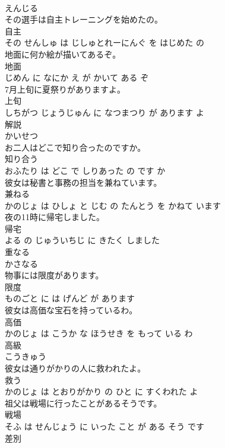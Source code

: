 \documentclass[8pt]{extreport}
\begin{document}
\begin{CJK}{UTF8}{min}
\\	えんじる		
\\	その選手は自主トレーニングを始めたの。	
\\	自主 
\\	その せんしゅ は じしゅとれーにんぐ を はじめた の			
\\	地面に何か絵が描いてあるぞ。	
\\	地面 
\\	じめん に なにか え が かいて ある ぞ			
\\	7月上旬に夏祭りがありますよ。	
\\	上旬 
\\	しちがつ じょうじゅん に なつまつり が あります よ			
\\	解説	
\\	かいせつ		
\\	お二人はどこで知り合ったのですか。	
\\	知り合う 
\\	おふたり は どこ で しりあった の です か			
\\	彼女は秘書と事務の担当を兼ねています。	
\\	兼ねる 
\\	かのじょ は ひしょ と じむ の たんとう を かねて います			
\\	夜の11時に帰宅しました。	
\\	帰宅 
\\	よる の じゅういちじ に きたく しました			
\\	重なる	
\\	かさなる		
\\	物事には限度があります。	
\\	限度 
\\	ものごと に は げんど が あります			
\\	彼女は高価な宝石を持っているわ。	
\\	高価 
\\	かのじょ は こうか な ほうせき を もって いる わ			
\\	高級	
\\	こうきゅう		
\\	彼女は通りがかりの人に救われたよ。	
\\	救う 
\\	かのじょ は とおりがかり の ひと に すくわれた よ			
\\	祖父は戦場に行ったことがあるそうです。	
\\	戦場 
\\	そふ は せんじょう に いった こと が ある そう です			
\\	差別	

\end{CJK}
\end{document}
